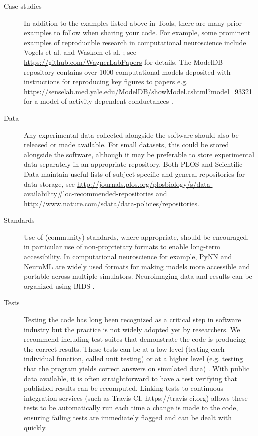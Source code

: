 \documentclass[11pt]{article}
\begin{document}
\begin{description}
\item [Case studies] In addition to the examples listed above in
  Tools\cite{Delescluse2011,Stevens2013,Eglen2014}, there are many
  prior examples to follow when sharing your code.  For example, some
  prominent examples of reproducible research in computational
  neuroscience include Vogels et al. \cite{Vogels2011-c8c} and Waskom
  et al. \cite{Waskom2014-gd}; see
  \url{https://github.com/WagnerLabPapers} for details.  The ModelDB
  repository contains over 1000 computational models deposited with
  instructions for reproducing key figures to papers
  e.g. \url{https://senselab.med.yale.edu/ModelDB/showModel.cshtml?model=93321}
  for a model of activity-dependent conductances \cite{Liu1998}.



\item [Data] Any experimental data collected alongside the software
  should also be released or made available.  For small datasets, this
  could be stored alongside the software, although it may be
  preferable to store experimental data separately in an appropriate
  repository.  Both PLOS and Scientific Data maintain useful lists of
  subject-specific and general repositories for data storage, see
  \url{http://journals.plos.org/plosbiology/s/data-availability#loc-recommended-repositories}
  and \url{http://www.nature.com/sdata/data-policies/repositories}.
  

  
\item [Standards] Use of (community) standards, where appropriate, should
  be encouraged, in particular use of non-proprietary formats
  to enable long-term accessibility.
  In computational neuroscience for example, PyNN
  \cite{Davison2009} and NeuroML \cite{CannonEtAl2014} are widely used
  formats for making models more accessible and portable across
  multiple simulators.  Neuroimaging data and results can be organized
  using BIDS \cite{Gorgolewski2016}.


\item [Tests] Testing the code has long been recognized
  as a critical step in software industry but the practice is not
  widely adopted yet by researchers. We recommend including test
  suites that demonstrate the code is producing the correct
  results\cite{Axelrod2014-xi}. These tests can be at a low level
  (testing each individual function, called unit testing) or at a
  higher level (e.g. testing that the program yields correct answers
  on simulated data) \cite{wilson_best_2014}. With public data available,
  it is often straightforward to have a test verifying that published
  results can be recomputed. Linking tests to continuous 
  integration services (such as Travis CI, https://travis-ci.org) allows 
  these tests to be automatically run each time a change is made to the code,
  ensuring failing tests are immediately flagged and can be dealt with quickly.

\end{description}
\end{document}
